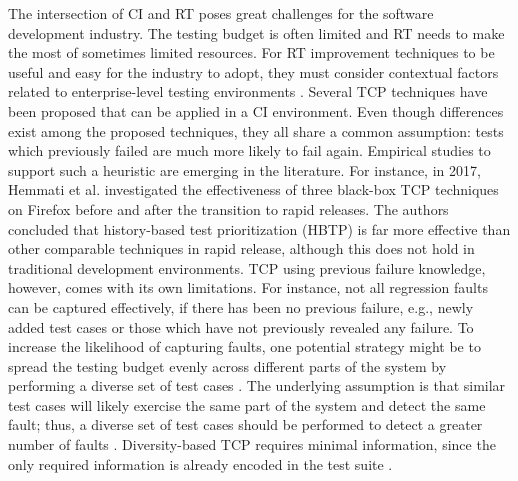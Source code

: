 \documentclass[1p]{elsarticle}
\begin{document}
The intersection of CI and RT poses great challenges for the software development industry. The testing budget is often limited and RT needs to make the most of sometimes limited resources. For RT improvement techniques to be useful and easy for the industry to adopt, they must consider contextual factors related to enterprise-level testing environments \cite{do2016chapter}. Several TCP techniques have been proposed that can be applied in a CI environment\cite{kim2002history,elbaum2014techniques,marijan2013test,strandberg2016experience,srikanth2016test,hemmati2017prioritizing,spieker2017reinforcement}. Even though differences exist among the proposed techniques, they all share a common assumption: tests which previously failed are much more likely to fail again. Empirical studies to support such a heuristic are emerging in the literature. For instance, in 2017, Hemmati et al. \cite{hemmati2017prioritizing} investigated the effectiveness of three black-box TCP techniques on Firefox before and after the transition to rapid releases. The authors concluded that history-based test prioritization (HBTP) is far more effective than other comparable techniques in rapid release, although this does not hold in traditional development environments. TCP using previous failure knowledge, however, comes with its own limitations. For instance, not all regression faults can be captured effectively, if there has been no previous failure, e.g., newly added test cases or those which have not previously revealed any failure. To increase the likelihood of capturing faults, one potential strategy might be to spread the testing budget evenly across different parts of the system by performing a diverse set of test cases \cite{ledru2012prioritizing}. The underlying assumption is that similar test cases will likely exercise the same part of the system and detect the same fault; thus, a diverse set of test cases should be performed to detect a greater number of faults \cite{jiang2009adaptive}. Diversity-based TCP requires minimal information, since the only required information is already encoded in the test suite \cite{ledru2012prioritizing}.
\end{document}
